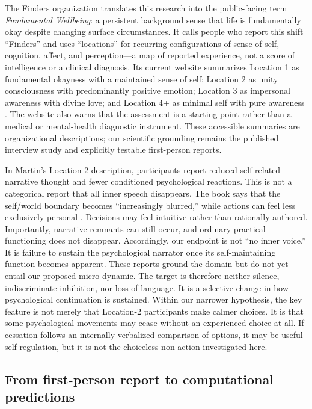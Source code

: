 \documentclass[10pt,twocolumn]{article}
\begin{document}
The Finders organization translates this research into the public-facing term
\emph{Fundamental Wellbeing}: a persistent background sense that life is
fundamentally okay despite changing surface circumstances. It calls people who
report this shift ``Finders'' and uses ``locations'' for recurring configurations
of sense of self, cognition, affect, and perception---a map of reported experience,
not a score of intelligence or a clinical diagnosis. Its current website
summarizes Location 1 as fundamental okayness with a maintained sense of self;
Location 2 as unity consciousness with predominantly positive emotion; Location 3
as impersonal awareness with divine love; and Location 4+ as minimal self with
pure awareness \citep{finders2026locations}. The website also warns that the
assessment is a starting point rather than a medical or mental-health diagnostic
instrument. These accessible summaries are organizational descriptions; our
scientific grounding remains the published interview study and explicitly
testable first-person reports.

In Martin's Location-2 description, participants report reduced self-related
narrative thought and fewer conditioned psychological reactions. This is not a
categorical report that all inner speech disappears. The book says
that the self/world boundary becomes ``increasingly blurred,'' while actions can
feel less exclusively personal \citep[pp.~52--53]{martin2019finders}. Decisions
may feel intuitive rather than rationally authored. Importantly, narrative
remnants can still occur, and ordinary practical functioning does not disappear.
Accordingly, our endpoint is not ``no inner voice.'' It is failure to sustain the
psychological narrator once its self-maintaining function becomes apparent.
These reports ground the domain but do not yet entail our proposed micro-dynamic.
The target is therefore neither silence, indiscriminate inhibition, nor loss of
language. It is a selective change in how psychological continuation is sustained.
Within our narrower hypothesis, the key feature is not merely that Location-2
participants make calmer choices. It is that some psychological movements may
cease without an experienced choice at all. If cessation follows an internally
verbalized comparison of options, it may be useful self-regulation, but it is not
the choiceless non-action investigated here.

\subsection{From first-person report to computational predictions}
\end{document}
